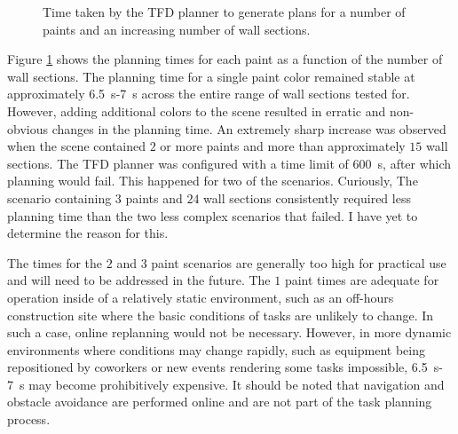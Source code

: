 \begin{figure}
    \centering
    \caption{Time taken by the TFD planner to generate plans for a number of paints and an increasing number of wall sections.}
    \label{fig:plan_time}
\end{figure}

Figure \ref{fig:plan_time} shows the planning times for each paint as a function of the number of wall sections. The planning time for a single paint color remained stable at approximately \SI{6.5}{\second}-\SI{7}{\second} across the entire range of wall sections tested for. However, adding additional colors to the scene resulted in erratic and non-obvious changes in the planning time. An extremely sharp increase was observed when the scene contained $2$ or more paints and more than approximately $15$ wall sections. The TFD planner was configured with a time limit of \SI{600}{\second}, after which planning would fail. This happened for two of the scenarios. Curiously, The scenario containing $3$ paints and $24$ wall sections consistently required less planning time than the two less complex scenarios that failed. I have yet to determine the reason for this. 

The times for the $2$ and $3$ paint scenarios are generally too high for practical use and will need to be addressed in the future. The $1$ paint times are adequate for operation inside of a relatively static environment, such as an off-hours construction site where the basic conditions of tasks are unlikely to change. In such a case, online replanning would not be necessary. However, in more dynamic environments where conditions may change rapidly, such as equipment being repositioned by coworkers or new events rendering some tasks impossible, \SI{6.5}{\second}-\SI{7}{\second} may become prohibitively expensive. It should be noted that navigation and obstacle avoidance are performed online and are not part of the task planning process.